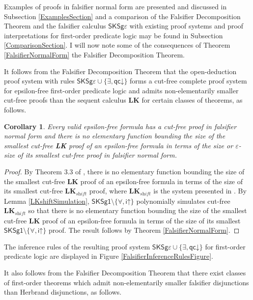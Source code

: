 \documentclass[10pt]{article}
\newtheorem{corollary}[theorem]{Corollary}
\theoremstyle{definition}\newtheorem{remark}[theorem]{Remark}
\theoremstyle{definition}\newtheorem{example}[theorem]{Example}
\theoremstyle{definition}\newtheorem{definition}[theorem]{Definition}
\newcommand{\SKSq}{{\mathsf{SKSg1}}}
\newcommand{\FalsifierCalculus}{{\mathsf{SKSg\varepsilon}}}
\newcommand{\iUp}{{\mathsf{i\mathord\uparrow}}}
\newcommand{\qcDown}{{\mathsf{qc\mathord\downarrow}}}
\begin{document}
	Examples of proofs in falsifier normal form are presented and discussed in Subsection \ref{ExamplesSection} and a comparison of the Falsifier Decomposition Theorem and the falsifier calculus $\FalsifierCalculus$ with existing proof systems and proof interpretations for first-order predicate logic may be found in Subsection \ref{ComparisonSection}. I will now note some of the consequences of Theorem \ref{FalsifierNormalForm} the Falsifier Decomposition Theorem.

	It follows from the Falsifier Decomposition Theorem that the open-deduction proof system with rules $\FalsifierCalculus \cup \{\exists, \qcDown\}$ forms a cut-free complete proof system for epsilon-free first-order predicate logic and admits non-elementarily smaller cut-free proofs than the sequent calculus \textbf{LK} for certain classes of theorems, as follows.

	\begin{corollary}\label{FalsifiersGiveShorterProofs}
		Every valid epsilon-free formula has a cut-free proof in falsifier normal form and there is no elementary function bounding the size of the smallest cut-free \textbf{LK} proof of an epsilon-free formula in terms of the size or $\varepsilon$-size of its smallest cut-free proof in falsifier normal form.
	\end{corollary}
	
	\begin{proof}
		By Theorem 3.3 of \cite{BaazUnsoundInferences}, there is no elementary function bounding the size of the smallest cut-free \textbf{LK} proof of an epsilon-free formula in terms of the size of its smallest cut-free $\textbf{LK}_\textit{shift}$ proof, where $\textbf{LK}_\textit{shift}$ is the system presented in \cite{BaazUnsoundInferences}. By Lemma \ref{LKshiftSimulation}, $\SKSq \setminus \{\forall, \iUp\}$ polynomially simulates cut-free $\textbf{LK}_\textit{shift}$ so that there is no elementary function bounding the size of the smallest cut-free \textbf{LK} proof of an epsilon-free formula in terms of the size of its smallest $\SKSq \setminus \{\forall, \iUp\}$ proof. The result follows by Theorem \ref{FalsifierNormalForm}.
	\end{proof}

	The inference rules of the resulting proof system $\FalsifierCalculus \cup \{\exists, \qcDown\}$ for first-order predicate logic are displayed in Figure \ref{FalsifierInferenceRulesFigure}.

	It also follows from the Falsifier Decomposition Theorem that there exist classes of first-order theorems which admit non-elementarily smaller falsifier disjunctions than Herbrand disjunctions, as follows.
	
\end{document}
